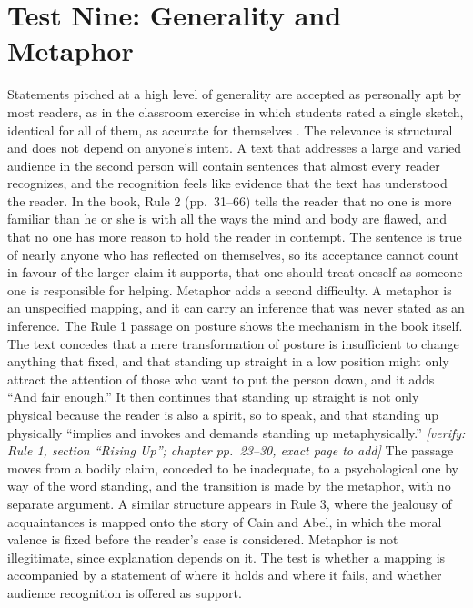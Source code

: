 \documentclass[12pt]{article}
\newif\ifverify\verifytrue
\newcommand{\passage}[1]{\ifverify{\footnotesize\color{gray}\textit{[verify: #1]}}\fi}
\begin{document}
\section{Test Nine: Generality and Metaphor}\label{sec:t9}

Statements pitched at a high level of generality are accepted as personally apt by most readers, as in the classroom exercise in which students rated a single sketch, identical for all of them, as accurate for themselves \cite{forer1949}. The relevance is structural and does not depend on anyone's intent. A text that addresses a large and varied audience in the second person will contain sentences that almost every reader recognizes, and the recognition feels like evidence that the text has understood the reader. In the book, Rule 2 (pp.~31--66) tells the reader that no one is more familiar than he or she is with all the ways the mind and body are flawed, and that no one has more reason to hold the reader in contempt. The sentence is true of nearly anyone who has reflected on themselves, so its acceptance cannot count in favour of the larger claim it supports, that one should treat oneself as someone one is responsible for helping. Metaphor adds a second difficulty. A metaphor is an unspecified mapping, and it can carry an inference that was never stated as an inference. The Rule 1 passage on posture shows the mechanism in the book itself. The text concedes that a mere transformation of posture is insufficient to change anything that fixed, and that standing up straight in a low position might only attract the attention of those who want to put the person down, and it adds ``And fair enough.'' It then continues that standing up straight is not only physical because the reader is also a spirit, so to speak, and that standing up physically ``implies and invokes and demands standing up metaphysically.'' \passage{Rule 1, section ``Rising Up''; chapter pp.~23--30, exact page to add} The passage moves from a bodily claim, conceded to be inadequate, to a psychological one by way of the word standing, and the transition is made by the metaphor, with no separate argument. A similar structure appears in Rule 3, where the jealousy of acquaintances is mapped onto the story of Cain and Abel, in which the moral valence is fixed before the reader's case is considered. Metaphor is not illegitimate, since explanation depends on it. The test is whether a mapping is accompanied by a statement of where it holds and where it fails, and whether audience recognition is offered as support.
\end{document}
